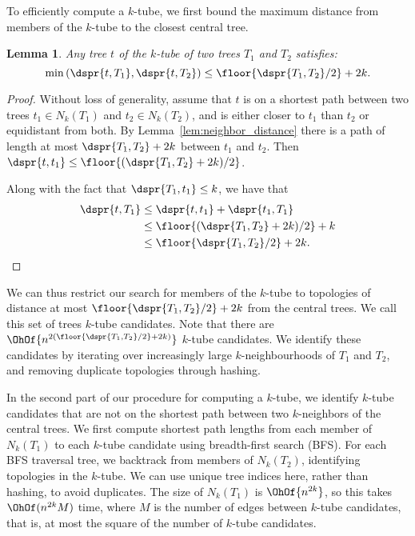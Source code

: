 \documentclass{amsart}
\newtheorem{lemma}[theorem]{Lemma}
\begin{document}
To efficiently compute a $k$-tube, we first bound the maximum distance from members of the $k$-tube to the closest central tree.
\begin{lemma}
	\label{lem:k_tube_distance}
	Any tree $t$ of the $k$-tube of two trees $T_1$ and $T_2$ satisfies:
	\[ \min\left({\dspr{t, T_1}, \dspr{t, T_2}}\right) \le \floor{\dspr{T_1, T_2}/2} + 2k .\]
\end{lemma}
\begin{proof}
Without loss of generality, assume that $t$ is on a shortest path between two trees $t_1 \in N_k(T_1)$ and $t_2 \in N_k(T_2)$, and is either closer to $t_1$ than $t_2$ or equidistant from both.
By Lemma~\ref{lem:neighbor_distance} there is a path of length at most $\dspr{T_1, T_2} + 2k$ between $t_1$ and $t_2$.
Then $\dspr{t, t_1} \le \floor{(\dspr{T_1, T_2} + 2k) / 2}$.

Along with the fact that $\dspr{T_1, t_1} \le k$, we have that
\begin{align*}
\dspr{t, T_1} &\le \dspr{t, t_1} + \dspr{t_1, T_1} \\
&\le \floor{(\dspr{T_1, T_2} + 2k) / 2} + k \\
&\le \floor{\dspr{T_1, T_2} / 2} + 2k.
\end{align*}

\end{proof}
We can thus restrict our search for members of the $k$-tube to topologies of distance at most $\floor{\dspr{T_1, T_2}/2} + 2k$ from the central trees.
We call this set of trees $k$-tube candidates.
Note that there are $\OhOf{n^{2(\floor{\dspr{T_1, T_2}/2} + 2k)}}$ $k$-tube candidates.
We identify these candidates by iterating over increasingly large $k$-neighbourhoods of $T_1$ and $T_2$, and removing duplicate topologies through hashing.  

In the second part of our procedure for computing a $k$-tube, we identify $k$-tube candidates that are not on the shortest path between two $k$-neighbors of the central trees.
We first compute shortest path lengths from each member of $N_k(T_1)$ to each $k$-tube candidate using breadth-first search (BFS).
For each BFS traversal tree, we backtrack from members of $N_k(T_2)$, identifying topologies in the $k$-tube.
We can use unique tree indices here, rather than hashing, to avoid duplicates.
The size of $N_k(T_1)$ is $\OhOf{n^{2k}}$, so this takes
$\OhOf( n^{2k} M)$ time, where $M$ is the number of edges between $k$-tube candidates, that is, at most the square of the number of $k$-tube candidates. 
\end{document}
